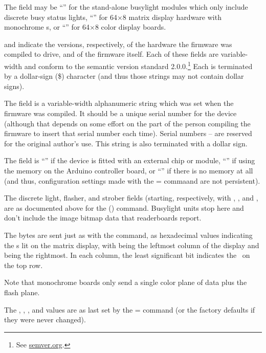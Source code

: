 The  field may be %
``'' for the stand-alone busylight modules which only include discrete busy status lights,
``'' for 64$\times$8 matrix display hardware with monochrome s, or
``'' for 64$\times$8  color display boards.

 and  indicate the versions, respectively, of the 
hardware the firmware was compiled to drive, and of the firmware itself. Each of
these fields are variable-width and conform to the semantic version standard 2.0.0.\footnote{See
\href{https://semver.org}{semver.org}.} Each is terminated by a dollar-sign (\z\$) character (and
thus those strings may not contain dollar signs).

The  field is a variable-width alphanumeric string which was set when the firm\-ware was
compiled. It should be a unique serial number for the device (although that depends on
some effort on the part of the person compiling the firmware to insert that serial number
each time). Serial numbers -- are reserved for the original author's use. This string is also
terminated with a dollar sign.

The  field is ``'' if the device is fitted with an external  chip or module,
``'' if using the  memory on the Arduino controller board, or ``\z{\_}'' if there
is no  memory at all (and thus, configuration settings made with the \z= commaand
are not persistent).

The discrete light, flasher, and strober fields (starting, respectively, with , , and ,
are as documented above for the  () command. Busylight units stop here and don't include
the image bitmap data that readerboards report.

The  bytes are sent just as with the  command, as hexadecimal values indicating
the \led s lit on the matrix display, with  being the leftmost column of the display
and  being the rightmost. In each column, the least significant bit indicates
the \led\ on the top row.

Note that monochrome boards only send a single color plane of data plus the flash plane.

The , , , and  values are as last set by the \z= command (or the factory
defaults if they were never changed).

